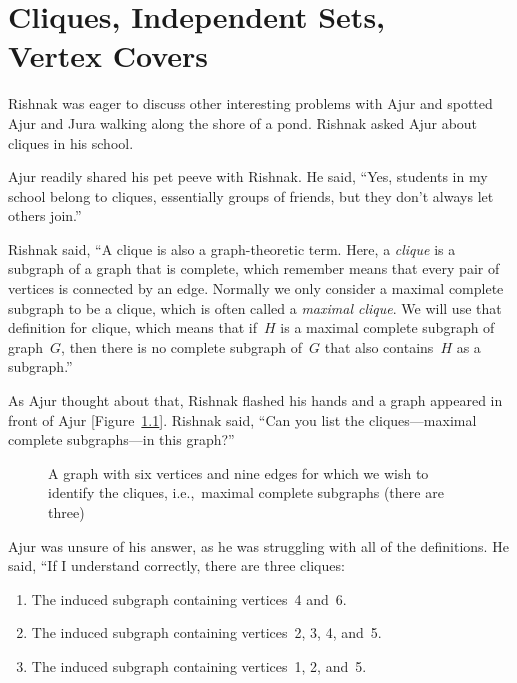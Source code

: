 \chapter{Cliques, Independent Sets, \\ Vertex Covers}
Rishnak was eager to discuss other interesting problems with Ajur and spotted Ajur and Jura walking along the shore of a pond. Rishnak asked Ajur about cliques in his school.

Ajur readily shared his pet peeve with Rishnak. He said, ``Yes, students in my school belong to cliques, essentially groups of friends, but they don't always let others join.''

Rishnak said, ``A clique is also a graph-theoretic term. Here, a \textit{clique} is a subgraph of a graph that is complete, which remember means that every pair of vertices is connected by an edge. Normally we only consider a maximal complete subgraph to be a clique, which is often called a \textit{maximal clique}. We will use that definition for clique, which means that if~$H$ is a maximal complete subgraph of graph~$G$, then there is no complete subgraph of~$G$ that also contains~$H$ as a subgraph.'' 

As Ajur thought about that, Rishnak flashed his hands and a graph appeared in front of Ajur [Figure~\ref{13g1}]. Rishnak said, ``Can you list the cliques---maximal complete subgraphs---in this graph?''

\begin{figure}
\begin{center}
\caption{A graph with six vertices and nine edges for which we wish to identify the cliques, i.e.,~maximal complete subgraphs (there are three)}\label{13g1}
\end{center}
\end{figure}

Ajur was unsure of his answer, as he was struggling with all of the definitions. He said, ``If I understand correctly, there are three cliques:
\begin{enumerate}
    \item The induced subgraph containing vertices~4 and~6.
    \item The induced subgraph containing vertices~2, 3, 4, and~5.
    \item The induced subgraph containing vertices~1, 2, and~5.
\end{enumerate} 

